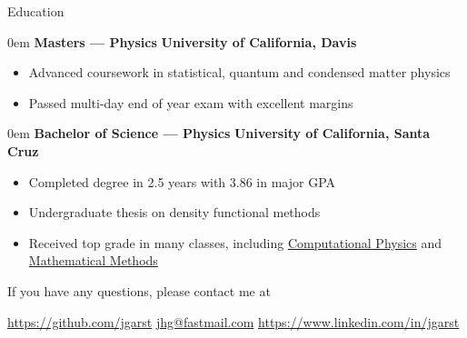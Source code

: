 \documentclass[11pt,a4paper]{article}
\newenvironment{headedsection}[2]{
    \begin{addmargin}[0.5em]{0em}
    {\large\bfseries #1} \hfill {\bfseries #2}%
    \begin{itemize}
        [label={}, topsep=0pt, itemsep=1.5pt, parsep=0pt, leftmargin=1.5em]
}{
    \end{itemize}
    \end{addmargin}
    \medskip
}
\begin{document}
\begin{mysection}{Education}
    \begin{headedsection}{Masters --- Physics}
          {University of California, Davis}

        \item Advanced coursework in statistical, quantum and condensed matter
            physics
        \item Passed multi-day end of year exam with excellent margins
    \end{headedsection}

    \begin{headedsection}{Bachelor of Science --- Physics}
          {University of California, Santa Cruz}

        \item Completed degree in 2.5 years with 3.86 in major GPA
        \item Undergraduate thesis on density functional methods
        \item Received top grade in many classes, including 
            \href{http://young.physics.ucsc.edu/115/}{Computational Physics}
            and
            \href{http://scipp.ucsc.edu/~haber/ph116C/}{Mathematical Methods}
    \end{headedsection}
\end{mysection}

\vfill

\begin{center}
    If you have any questions, please contact me at
\end{center}

\begin{center}
    \href{https://github.com/jgarst}{https://github.com/jgarst} 
    \textbullet{} 
    \href{jhg@fastmail.com}{jhg@fastmail.com}
    \textbullet{} 
    \href{https://www.linkedin.com/in/jgarst}
        {https://www.linkedin.com/in/jgarst}
\end{center}
\end{document}
